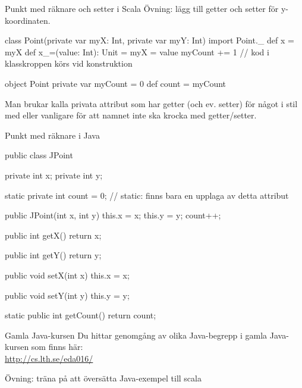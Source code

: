\begin{Slide}{Punkt med räknare och setter i Scala}
Övning: lägg till getter och setter för y-koordinaten.
\begin{Code}
class Point(private var myX: Int, private var myY: Int){
  import Point._
  def x = myX
  def x_=(value: Int): Unit = {
    myX = value
  }
  myCount += 1   // kod i klasskroppen körs vid konstruktion
}

object Point {
  private var myCount = 0
  def count = myCount
}
\end{Code}
\SlideFontSmall
Man brukar kalla privata attribut som har getter (och ev. setter) för något i stil med  eller vanligare  för att namnet inte ska krocka med getter/setter.
\end{Slide}



\begin{Slide}{Punkt med räknare i Java}

\begin{Code}[language=Java,basicstyle=\ttfamily\SlideFontSize{5.2}{6}]
public class JPoint {
    private int x;
    private int y;

    static private int count = 0;  // static: finns bara en upplaga av detta attribut

    public JPoint(int x, int y){
        this.x = x;
        this.y = y;
        count++;
    }

    public int getX(){
        return x;
    }

    public int getY(){
        return y;
    }

    public void setX(int x){
        this.x = x;
    }

    public void setY(int y){
        this.y = y;
    }

    static public int getCount(){
       return count;
    }
}
\end{Code}


\end{Slide}

\begin{Slide}{Gamla Java-kursen}
Du hittar genomgång av olika Java-begrepp i gamla Java-kursen som finns här: \\\vspace{1em}
\url{http://cs.lth.se/eda016/}
\\\vspace{2em}

Övning: träna på att översätta Java-exempel till scala

\end{Slide}


